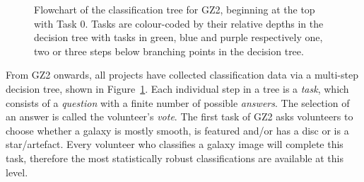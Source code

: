 \begin{figure}
\caption[GZ2 classification decision tree]{Flowchart of the classification tree for GZ2, beginning at the top with Task 0. Tasks are colour-coded by their relative depths in the decision tree with tasks in green, blue and purple respectively one, two or three steps below branching points in the decision tree.}
\label{fig:gztree}
\end{figure}

From GZ2 onwards, all projects have collected classification data via a multi-step decision tree, shown in Figure~\ref{fig:gztree}.  Each individual step in a tree is a \emph{task}, which consists of a \emph{question} with a finite number of possible \emph{answers}. The selection of an answer is called the volunteer's \emph{vote}. The first task of GZ2 asks volunteers to choose whether a galaxy is mostly smooth, is featured and/or has a disc or is a star/artefact. Every volunteer who classifies a galaxy image will complete this task, therefore the most statistically robust classifications are available at this level.

